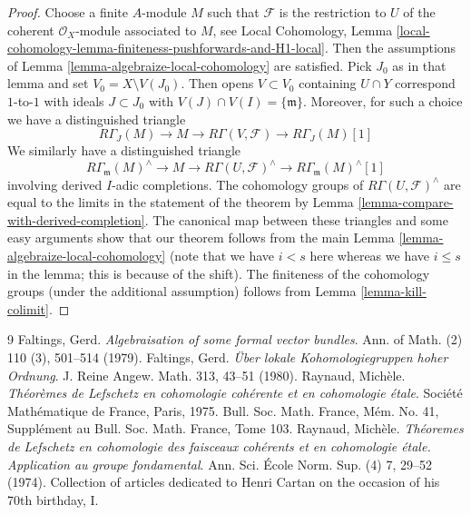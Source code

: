 \documentclass[10pt,a4paper]{amsart}
\theoremstyle{plain}
\theoremstyle{definition}
\theoremstyle{remark}
\numberwithin{equation}{subsection}
\begin{document}
\begin{proof}
Choose a finite $A$-module $M$ such that $\mathcal{F}$ is the
restriction to $U$ of the
coherent $\mathcal{O}_X$-module associated to $M$, see Local Cohomology,
Lemma \ref{local-cohomology-lemma-finiteness-pushforwards-and-H1-local}.
Then the assumptions of
Lemma \ref{lemma-algebraize-local-cohomology}
are satisfied.
Pick $J_0$ as in that lemma and set $V_0 = X \setminus V(J_0)$.
Then opens $V \subset V_0$ containing $U \cap Y$
correspond $1$-to-$1$ with ideals $J \subset J_0$ with
$V(J) \cap V(I) = \{\mathfrak m\}$.
Moreover, for such a choice we have a distinguished triangle
$$
R\Gamma_J(M) \to M \to R\Gamma(V, \mathcal{F}) \to
R\Gamma_J(M)[1]
$$
We similarly have a distinguished triangle
$$
R\Gamma_\mathfrak m(M)^\wedge \to
M \to
R\Gamma(U, \mathcal{F})^\wedge \to
R\Gamma_\mathfrak m(M)^\wedge[1]
$$
involving derived $I$-adic completions.
The cohomology groups of $R\Gamma(U, \mathcal{F})^\wedge$ are
equal to the limits in the statement of the theorem by
Lemma \ref{lemma-compare-with-derived-completion}.
The canonical map between these triangles
and some easy arguments show that our
theorem follows from the main Lemma \ref{lemma-algebraize-local-cohomology}
(note that we have $i < s$ here whereas we have
$i \leq s$ in the lemma; this is because of the shift).
The finiteness of the cohomology groups
(under the additional assumption) follows from
Lemma \ref{lemma-kill-colimit}.
\end{proof}

\begin{thebibliography}{9}
Faltings, Gerd.
\newblock \emph{Algebraisation of some formal vector bundles}.
\newblock Ann. of Math. (2) 110 (3), 501--514 (1979).
Faltings, Gerd.
\newblock \emph{\"Uber lokale {K}ohomologiegruppen hoher {O}rdnung}.
\newblock J. Reine Angew. Math. 313, 43--51 (1980).
Raynaud, Mich\`ele.
\newblock \emph{Th\'eor\`emes de {L}efschetz en cohomologie coh\'erente et en cohomologie \'etale}.
\newblock Soci\'et\'e Math\'ematique de France, Paris, 1975.
\newblock Bull. Soc. Math. France, M\'em. No. 41, Suppl\'ement au Bull. Soc. Math. France, Tome 103.
Raynaud, Mich\`ele.
\newblock \emph{Th\'eoremes de {L}efschetz en cohomologie des faisceaux coh\'erents et en cohomologie \'etale. {A}pplication au groupe fondamental}.
\newblock Ann. Sci. \'Ecole Norm. Sup. (4) 7, 29--52 (1974).
\newblock Collection of articles dedicated to Henri Cartan on the occasion of his 70th birthday, I.
\end{thebibliography}
\end{document}
